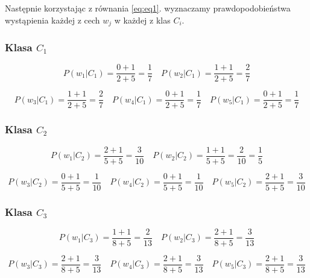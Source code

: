 \documentclass{article}
\begin{document}
Następnie korzystając z równania \ref{eq:eq1}. wyznaczamy prawdopodobieństwa
wystąpienia każdej z cech $w_j$ w każdej z klas $C_i$.

\subsubsection*{Klasa $C_1$}

\begin{equation*}
    P(w_1|C_1) = \frac{0 + 1}{2 + 5} = \frac{1}{7} \quad P(w_2|C_1) = \frac{1 + 1}{2 + 5} = \frac{2}{7}
\end{equation*}

\begin{equation*}
    P(w_3|C_1) = \frac{1 + 1}{2 + 5} = \frac{2}{7} \quad P(w_4|C_1) = \frac{0 + 1}{2 + 5} = \frac{1}{7} \quad P(w_5|C_1) = \frac{0 + 1}{2 + 5} = \frac{1}{7}
\end{equation*}

\subsubsection*{Klasa $C_2$}

\begin{equation*}
    P(w_1|C_2) = \frac{2 + 1}{5 + 5} = \frac{3}{10} \quad P(w_2|C_2) = \frac{1 + 1}{5 + 5} = \frac{2}{10} = \frac{1}{5}
\end{equation*}

\begin{equation*}
    P(w_3|C_2) = \frac{0 + 1}{5 + 5} = \frac{1}{10} \quad P(w_4|C_2) = \frac{0 + 1}{5 + 5} = \frac{1}{10} \quad P(w_5|C_2) = \frac{2 + 1}{5 + 5} = \frac{3}{10}
\end{equation*}

\subsubsection*{Klasa $C_3$}

\begin{equation*}
    P(w_1|C_3) = \frac{1 + 1}{8 + 5} = \frac{2}{13} \quad P(w_2|C_3) = \frac{2 + 1}{8 + 5} = \frac{3}{13}
\end{equation*}

\begin{equation*}
    P(w_3|C_3) = \frac{2 + 1}{8 + 5} = \frac{3}{13} \quad P(w_4|C_3) = \frac{2 + 1}{8 + 5} = \frac{3}{13} \quad P(w_5|C_3) = \frac{2 + 1}{8 + 5} = \frac{3}{13}
\end{equation*}
    
\end{document}

